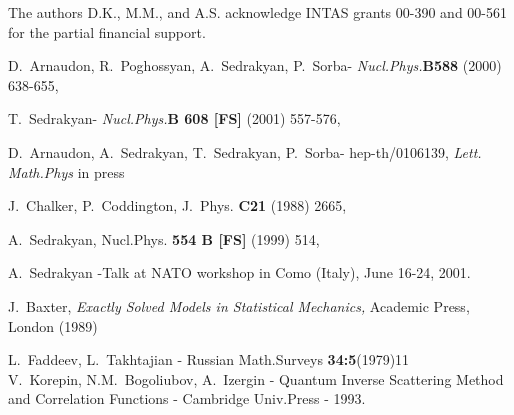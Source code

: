 \documentclass[a4paper,11pt]{article}
\begin{document}
The authors D.K., M.M., and A.S. acknowledge INTAS grants 00-390 and
00-561 for the partial financial support.

\begin{thebibliography}{99}

 D.~Arnaudon, R.~Poghossyan, A.~Sedrakyan, P.~Sorba-
{\it{Nucl.Phys.}}{\bf{B588}} (2000) 638-655,

 T.~Sedrakyan- {\it{Nucl.Phys.}}{\bf{B 608 [FS]}} (2001) 557-576,  

 D.~Arnaudon, A.~Sedrakyan, T.~Sedrakyan, P.~Sorba-
               hep-th/0106139, {\it{Lett. Math.Phys}} in press

 J.~Chalker, P.~Coddington,  J.~Phys. {\bf C21} (1988) 2665,

 A.~Sedrakyan, Nucl.Phys. {\bf 554 B [FS]} (1999) 514,

 A.~Sedrakyan -Talk at NATO workshop in Como (Italy), June
  16-24, 2001. 

 J.~Baxter, \textsl{Exactly Solved Models in Statistical
    Mechanics,} Academic Press, London (1989)

 L.~Faddeev, L.~Takhtajian - 
  Russian Math.Surveys {\bf 34:5}(1979)11\\
  V.~Korepin, N.M.~Bogoliubov, A.~Izergin - 
  \newblock Quantum Inverse Scattering Method and Correlation Functions - 
  Cambridge Univ.Press - 1993.

\end{thebibliography}
\end{document}
